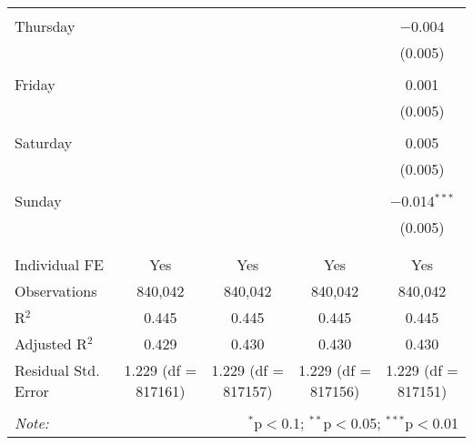 \documentclass[
]{article}
\begin{document}
\begin{table}[!htbp]
{\begin{tabular}{@{\extracolsep{5pt}}lcccc}
  & & & & \\ 
 Thursday &  &  &  & $-$0.004 \\ 
  &  &  &  & (0.005) \\ 
  & & & & \\ 
 Friday &  &  &  & 0.001 \\ 
  &  &  &  & (0.005) \\ 
  & & & & \\ 
 Saturday &  &  &  & 0.005 \\ 
  &  &  &  & (0.005) \\ 
  & & & & \\ 
 Sunday &  &  &  & $-$0.014$^{***}$ \\ 
  &  &  &  & (0.005) \\ 
  & & & & \\ 
\hline \\[-1.8ex] 
Individual FE & Yes & Yes & Yes & Yes \\ 
Observations & 840,042 & 840,042 & 840,042 & 840,042 \\ 
R$^{2}$ & 0.445 & 0.445 & 0.445 & 0.445 \\ 
Adjusted R$^{2}$ & 0.429 & 0.430 & 0.430 & 0.430 \\ 
Residual Std. Error & 1.229 (df = 817161) & 1.229 (df = 817157) & 1.229 (df = 817156) & 1.229 (df = 817151) \\ 
\hline 
\hline \\[-1.8ex] 
\textit{Note:}  & \multicolumn{4}{r}{$^{*}$p$<$0.1; $^{**}$p$<$0.05; $^{***}$p$<$0.01} \\ 
\end{tabular}
} 
\end{table} 
\newpage
\end{document}
